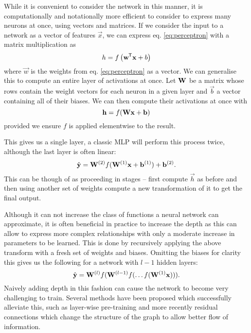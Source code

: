 While it is convenient to consider the network in this manner, it is computationally and
notationally more efficient to consider to express many neurons at once, using vectors and matrices.
If we consider the input to a network as a vector of features \(\vec{x}\), we can express
eq. \eqref{eq:perceptron} with a matrix multiplication as
\begin{equation}\label{eq:vecperceptron}
	h = f\left(\mathbf{w}^{\mkern-1.5mu\mathsf{T}}\mathbf{x} + b\right)
\end{equation} where \(\vec{w}\) is the weights from eq. \eqref{eq:perceptron} as a vector.
We can generalise this to compute an entire layer of activations at once. Let \(\mathbf{W}\) be a matrix
whose rows contain the weight vectors for each neuron in a given layer and \(\vec{b}\) a vector
containing all of their biases. We can then compute their
activations at once with
\begin{equation}
	\mathbf{h} = f(\mathbf{W}\mathbf{x} + \mathbf{b})
\end{equation} provided we ensure \(f\) is applied elementwise to the result.

This gives us a single layer, a classic MLP will perform this process twice, although the last layer
is often linear:
\begin{equation}
	\hat{\mathbf{y}} = \mathbf{W}^{(2)}f(\mathbf{W}^{(1)}\mathbf{x} + \mathbf{b}^{(1)}) + \mathbf{b}^{(2)}.
\end{equation} This can be though of as proceeding in stages -- first compute \(\vec{h}\) as before
and then using another set of weights compute a new transformation of it to get the final output.

Although it can not increase the class of functions a neural network can approximate, it is often
beneficial in practice to increase the depth as this can allow to express more complex relationships
with only a moderate increase in parameters to be learned. \autocite{Telgarsky2016} This is done
by recursively applying the above transform with a fresh set of weights and biases. Omitting the
biases for clarity this gives us the following for a network with \(l-1\) hidden layers:
\begin{equation}
	\hat{\mathbf{y}} = \mathbf{W}^{(l)}f(\mathbf{W}^{(l-1)}f(\dots f(\mathbf{W}^{(1)}\mathbf{x}))).
\end{equation} Naively adding depth in this fashion can cause the network to become very challenging
to train. \autocite{Glorot2010, Saxe2013} Several methods have been proposed which successfully
alleviate this, such as layer-wise pre-training \autocite{Hinton2006,Vincent2010} and more
recently residual connections which change the structure of the graph to allow better flow of 
information. \autocite{He2015}

